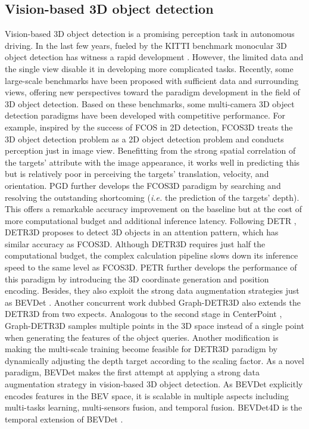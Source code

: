 \documentclass[10pt,twocolumn,letterpaper]{article}
\begin{document}
\subsection{Vision-based 3D object detection}
Vision-based 3D object detection is a promising perception task in autonomous driving. In the last few years, fueled by the KITTI \cite{KITTI} benchmark monocular 3D object detection has witness a rapid development \cite{lu2021geometry,liu2021autoshape,zhang2021objects,zou2021devil,zhou2021monocular,reading2021categorical,wang2021progressive,wang2021depth,kumar2021groomed}. However, the limited data and the single view disable it in developing more complicated tasks. Recently, some large-scale benchmarks \cite{NS, Waymo} have been proposed with sufficient data and surrounding views, offering new perspectives toward the paradigm development in the field of 3D object detection. Based on these benchmarks, some multi-camera 3D object detection paradigms have been developed with competitive performance. For example, inspired by the success of FCOS \cite{FCOS} in 2D detection, FCOS3D \cite{FCOS3D} treats the 3D object detection problem as a 2D object detection problem and conducts perception just in image view. Benefitting from the strong spatial correlation of the targets' attribute with the image appearance, it works well in predicting this but is relatively poor in perceiving the targets' translation, velocity, and orientation. PGD \cite{PGD} further develops the FCOS3D paradigm by searching and resolving the outstanding shortcoming (\textit{i.e.} the prediction of the targets' depth). This offers a remarkable accuracy improvement on the baseline but at the cost of more computational budget and additional inference latency. Following DETR \cite{DETR}, DETR3D \cite{DETR3D} proposes to detect 3D objects in an attention pattern, which has similar accuracy as FCOS3D. Although DETR3D requires just half the computational budget, the complex calculation pipeline slows down its inference speed to the same level as FCOS3D. PETR \cite{PETR} further develops the performance of this paradigm by introducing the 3D coordinate generation and position encoding. Besides, they also exploit the strong data augmentation strategies just as BEVDet \cite{BEVDet}. Another concurrent work dubbed Graph-DETR3D \cite{Graph-DETR3D} also extends the DETR3D from two expects. Analogous to the second stage in CenterPoint \cite{CenterPoint3D}, Graph-DETR3D samples multiple points in the 3D space instead of a single point when generating the features of the object queries. Another modification is making the multi-scale training become feasible for DETR3D paradigm by dynamically adjusting the depth target according to the scaling factor. As a novel paradigm, BEVDet \cite{BEVDet} makes the first attempt at applying a strong data augmentation strategy in vision-based 3D object detection. As BEVDet explicitly encodes features in the BEV space, it is scalable in multiple aspects including multi-tasks learning, multi-sensors fusion, and temporal fusion. BEVDet4D is the temporal extension of BEVDet \cite{BEVDet}.
\end{document}
